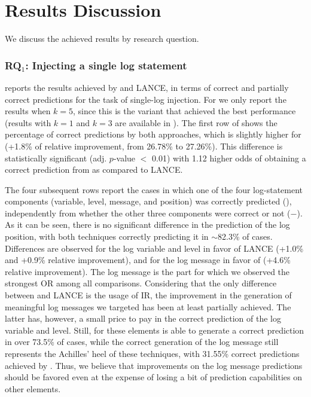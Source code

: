 \section{Results Discussion} \label{sec:results}

We discuss the achieved results by research question.


\subsubsection{RQ$_{1}$: Injecting a single log statement}
\label{sec:rq1}

 reports the results achieved by \approach and LANCE, in terms of correct and partially correct predictions for the task of single-log injection. For \approach we only report the results when $k=5$, since this is the variant that achieved the best performance (results with $k=1$ and $k=3$ are available in \cite{replication}). The first row of  shows the percentage of correct predictions by both approaches, which is slightly higher for \approach (+1.8\% of relative improvement, from 26.78\% to 27.26\%). This difference is statistically significant (adj. $p$-value $<$ 0.01) with 1.12 higher odds of obtaining a correct prediction from \approach as compared to LANCE. 



The four subsequent rows report the cases in which one of the four log-statement components (variable, level, message, and position) was correctly predicted (\cmark), independently from whether the other three components were correct or not ($-$). As it can be seen, there is no significant difference in the prediction of the log position, with both techniques correctly predicting it in $\sim$82.3\% of cases. Differences are observed for the log variable and level in favor of LANCE (+1.0\% and +0.9\% relative improvement), and for the log message in favor of \approach (+4.6\% relative improvement). The log message is the part for which we observed the strongest OR among all comparisons. Considering that the only difference between \approach and LANCE is the usage of IR, the improvement in the generation of meaningful log messages we targeted has been at least partially achieved. The latter has, however, a small price to pay in the correct prediction of the log variable and level. Still, for these elements \approach is able to generate a correct prediction in over 73.5\% of cases, while the correct generation of the log message still represents the Achilles' heel of these techniques, with 31.55\% correct predictions achieved by \approach. Thus, we believe that improvements on the log message predictions should be favored even at the expense of losing a bit of prediction capabilities on other elements.



